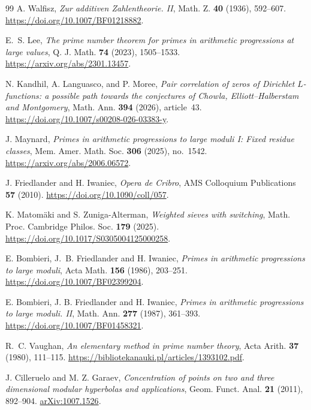 \documentclass[11pt,a4paper]{article}
\numberwithin{equation}{section}
\begin{document}
{\begin{thebibliography}{99}
A. Walfisz,
\newblock \emph{Zur additiven Zahlentheorie. II},
\newblock Math. Z. \textbf{40} (1936), 592--607.
\newblock \url{https://doi.org/10.1007/BF01218882}.

E.~S. Lee,
\newblock \emph{The prime number theorem for primes in arithmetic
progressions at large values},
\newblock Q. J. Math. \textbf{74} (2023), 1505--1533.
\newblock \url{https://arxiv.org/abs/2301.13457}.

N. Kandhil, A. Languasco, and P. Moree,
\newblock \emph{Pair correlation of zeros of Dirichlet $L$-functions:
a possible path towards the conjectures of Chowla, Elliott--Halberstam
and Montgomery},
\newblock Math. Ann. \textbf{394} (2026), article~43.
\newblock \url{https://doi.org/10.1007/s00208-026-03383-y}.

J. Maynard,
\newblock \emph{Primes in arithmetic progressions to large moduli I:
Fixed residue classes},
\newblock Mem. Amer. Math. Soc. \textbf{306} (2025), no.~1542.
\newblock \url{https://arxiv.org/abs/2006.06572}.

J. Friedlander and H. Iwaniec,
\newblock \emph{Opera de Cribro},
\newblock AMS Colloquium Publications \textbf{57} (2010).
\newblock \url{https://doi.org/10.1090/coll/057}.

K. Matom\"aki and S. Zuniga-Alterman,
\newblock \emph{Weighted sieves with switching},
\newblock Math. Proc. Cambridge Philos. Soc. \textbf{179} (2025).
\newblock \url{https://doi.org/10.1017/S0305004125000258}.

E. Bombieri, J.~B. Friedlander and H. Iwaniec,
\newblock \emph{Primes in arithmetic progressions to large moduli},
\newblock Acta Math. \textbf{156} (1986), 203--251.
\newblock \url{https://doi.org/10.1007/BF02399204}.

E. Bombieri, J. B. Friedlander and H. Iwaniec,
\newblock \emph{Primes in arithmetic progressions to large moduli. II},
\newblock Math. Ann. \textbf{277} (1987), 361--393.
\newblock \url{https://doi.org/10.1007/BF01458321}.

R.~C. Vaughan,
\newblock \emph{An elementary method in prime number theory},
\newblock Acta Arith. \textbf{37} (1980), 111--115.
\newblock \url{https://bibliotekanauki.pl/articles/1393102.pdf}.

J. Cilleruelo and M. Z. Garaev,
\emph{Concentration of points on two and three dimensional modular
hyperbolas and applications},
Geom. Funct. Anal. \textbf{21} (2011), 892--904.
\href{https://arxiv.org/abs/1007.1526}{arXiv:1007.1526}.


\end{thebibliography}}
\end{document}
